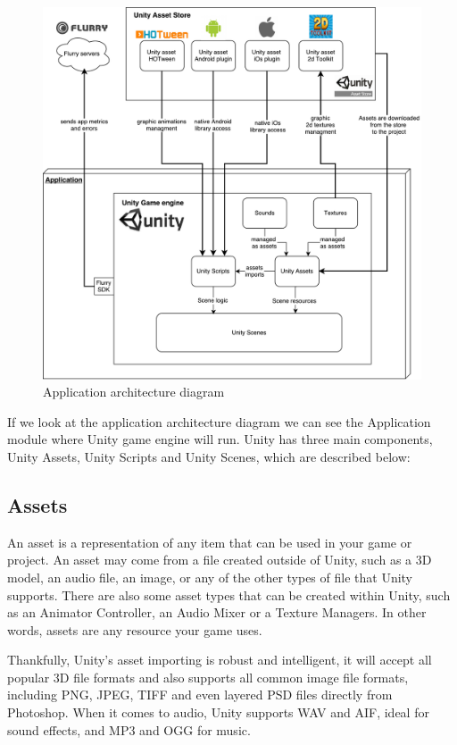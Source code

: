 \begin{figure}[h]
	\centering
	\includegraphics[width=400pt]{graphics/Application_architecture.pdf}
	\caption{Application architecture diagram}
	\label{fig:applicationarchitecture}
\end{figure}

If we look at the application architecture diagram we can see the Application module where Unity game engine will run. Unity has three main components, Unity Assets, Unity Scripts and Unity Scenes, which are described below:

\subsection{Assets}
An asset is a representation of any item that can be used in your game or project. An asset may come from a file created outside of Unity, such as a 3D model, an audio file, an image, or any of the other types of file that Unity supports. There are also some asset types that can be created within Unity, such as an Animator Controller, an Audio Mixer or a Texture Managers. In other words, assets are any resource your game uses.

Thankfully, Unity’s asset importing is robust and intelligent, it will accept all popular 3D file formats and also supports all common image file formats, including PNG, JPEG, TIFF and even layered PSD files directly from Photoshop. When it comes to audio, Unity supports WAV and AIF, ideal for sound effects, and MP3 and OGG for music.

